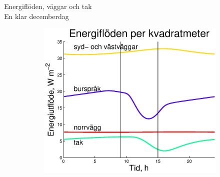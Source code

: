 \begin{frame}{Energiflöden, väggar och tak\\En klar decemberdag}
 
\begin{figure}
        \begin{subfigure}[b]{0.48\textwidth}
                \centering
                \includegraphics[width=\textwidth]{images/walls1.eps}
        \end{subfigure}
\end{figure}


\end{frame}



